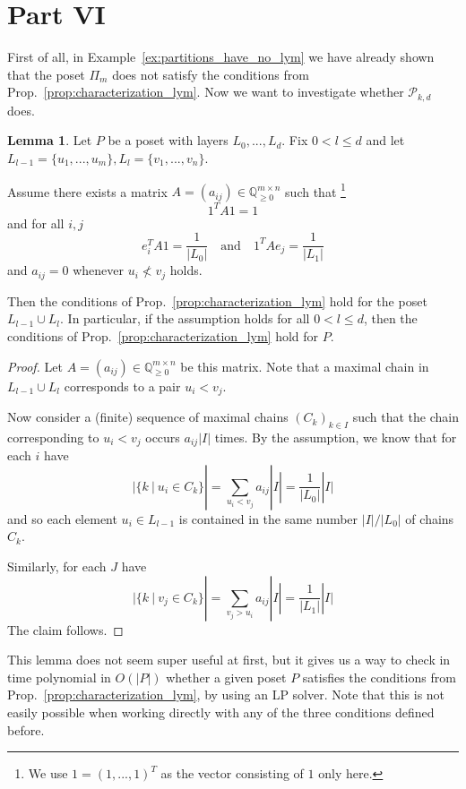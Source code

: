 \documentclass{scrartcl}
\newcommand{\Q}{\mathbb{Q}}
\theoremstyle{definition}
\newtheorem{lemma}[definition]{Lemma}
\begin{document}
\section{Part VI}
First of all, in Example~\ref{ex:partitions_have_no_lym} we have already shown that the poset $\Pi_m$ does not satisfy the conditions from Prop.~\ref{prop:characterization_lym}.
Now we want to investigate whether $\mathcal{P}_{k, d}$ does. 
\begin{lemma}
    \label{prop:lp_algorithm}
    Let $P$ be a poset with layers $L_0, ..., L_d$.
    Fix $0 < l \leq d$ and let $L_{l - 1} = \{ u_1, ..., u_m \}, L_l = \{ v_1, ..., v_n \}$.

    Assume there exists a matrix $A = (a_{ij}) \in \Q_{\geq 0}^{m \times n}$ such that
    \footnote{We use $1 = (1, ..., 1)^T$ as the vector consisting of $1$ only here.}
    \begin{equation*}
        1^T A 1 = 1
    \end{equation*}
    and for all $i, j$
    \begin{equation*}
        e_i^T A 1 = \frac 1 {|L_0|} \quad \text{and} \quad 1^T A e_j = \frac 1 {|L_1|}
    \end{equation*}
    and $a_{ij} = 0$ whenever $u_i \not< v_j$ holds.

    Then the conditions of Prop.~\ref{prop:characterization_lym} hold for the poset $L_{l - 1} \cup L_l$.
    In particular, if the assumption holds for all $0 < l \leq d$, then the conditions of Prop.~\ref{prop:characterization_lym} hold for $P$.
\end{lemma}
\begin{proof}
    Let $A = (a_{ij}) \in \Q_{\geq 0}^{m \times n}$ be this matrix.
    Note that a maximal chain in $L_{l - 1} \cup L_l$ corresponds to a pair $u_i < v_j$.

    Now consider a (finite) sequence of maximal chains $(C_k)_{k \in I}$ such that the chain corresponding to $u_i < v_j$ occurs $a_{ij} |I|$ times.
    By the assumption, we know that for each $i$ have
    \begin{equation*}
        |\{k \ | \ u_i \in C_k\}| = \sum_{u_i < v_j} a_{ij}|I| = \frac 1 {|L_0|} |I|
    \end{equation*}
    and so each element $u_i \in L_{l - 1}$ is contained in the same number $|I| / |L_0|$ of chains $C_k$.

    Similarly, for each $J$ have
    \begin{equation*}
        |\{k \ | \ v_j \in C_k\}| = \sum_{v_j > u_i} a_{ij}|I| = \frac 1 {|L_1|} |I|
    \end{equation*}
    The claim follows.
\end{proof}
This lemma does not seem super useful at first, but it gives us a way to check in time polynomial in $O(|P|)$ whether a given poset $P$ satisfies the conditions from Prop.~\ref{prop:characterization_lym}, by using an LP solver.
Note that this is not easily possible when working directly with any of the three conditions defined before.
\end{document}
